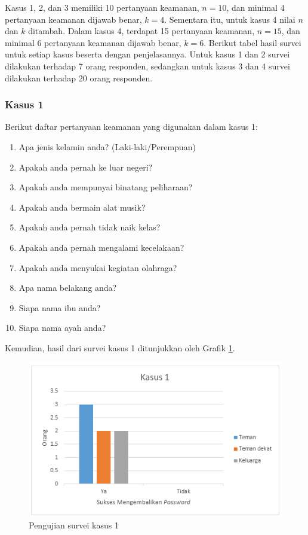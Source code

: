 Kasus 1, 2, dan 3 memiliki 10 pertanyaan keamanan, $n=10$, dan minimal 4 pertanyaan keamanan dijawab benar, $k=4$. Sementara itu, untuk kasus 4 nilai $n$ dan $k$ ditambah. Dalam kasus 4, terdapat 15 pertanyaan keamanan, $n=15$, dan minimal 6 pertanyaan keamanan dijawab benar, $k=6$. Berikut tabel hasil survei untuk setiap kasus beserta dengan penjelasannya. Untuk kasus 1 dan 2 survei dilakukan terhadap 7 orang responden, sedangkan untuk kasus 3 dan 4 survei dilakukan terhadap 20 orang responden.

\subsubsection{Kasus 1}

Berikut daftar pertanyaan keamanan yang digunakan dalam kasus 1:

\begin{enumerate}[itemsep=0mm]
	\item Apa jenis kelamin anda? (Laki-laki/Perempuan)
	\item Apakah anda pernah ke luar negeri?
	\item Apakah anda mempunyai binatang peliharaan?
	\item Apakah anda bermain alat musik?
	\item Apakah anda pernah tidak naik kelas?
	\item Apakah anda pernah mengalami kecelakaan?
	\item Apakah anda menyukai kegiatan olahraga?
	\item Apa nama belakang anda?
	\item Siapa nama ibu anda?
	\item Siapa nama ayah anda?
\end{enumerate}

Kemudian, hasil dari survei kasus 1 ditunjukkan oleh Grafik \ref{fig:kasus1}.

\begin{figure}[H]
	\includegraphics[scale=0.8]{Gambar/kasus1}
	\centering
	\caption{Pengujian survei kasus 1}\label{fig:kasus1}
\end{figure}

